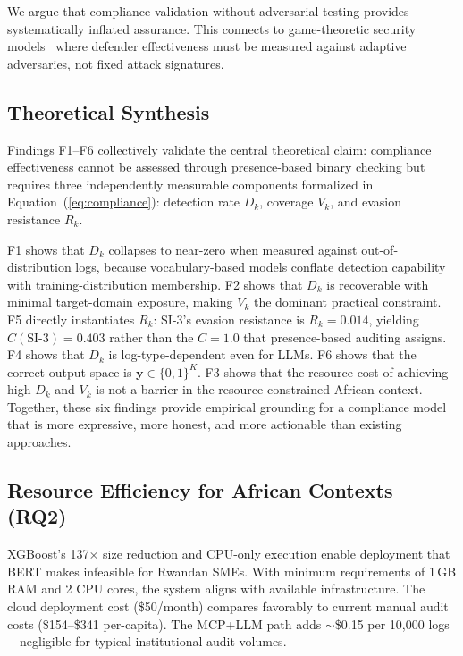 \documentclass[futureinternet,article,submit,pdftex,moreauthors]{Definitions/mdpi}
\begin{document}
We argue that compliance validation without adversarial testing provides systematically
inflated assurance. This connects to game-theoretic security models~\cite{mitre_attack_applications}
where defender effectiveness must be measured against adaptive adversaries, not fixed attack
signatures.

\subsection{Theoretical Synthesis}

Findings F1--F6 collectively validate the central theoretical claim: compliance effectiveness
cannot be assessed through presence-based binary checking but requires three independently
measurable components formalized in Equation~(\ref{eq:compliance}): detection rate $D_k$,
coverage $V_k$, and evasion resistance $R_k$.

F1 shows that $D_k$ collapses to near-zero when measured against out-of-distribution logs,
because vocabulary-based models conflate detection capability with training-distribution
membership. F2 shows that $D_k$ is recoverable with minimal target-domain exposure, making
$V_k$ the dominant practical constraint. F5 directly instantiates $R_k$: SI-3's evasion
resistance is $R_k = 0.014$, yielding $C(\text{SI-3}) = 0.403$ rather than the $C = 1.0$
that presence-based auditing assigns. F4 shows that $D_k$ is log-type-dependent even for
LLMs. F6 shows that the correct output space is $\mathbf{y} \in \{0,1\}^K$. F3 shows that
the resource cost of achieving high $D_k$ and $V_k$ is not a barrier in the
resource-constrained African context. Together, these six findings provide empirical grounding
for a compliance model that is more expressive, more honest, and more actionable than existing
approaches.

\subsection{Resource Efficiency for African Contexts (RQ2)}

XGBoost's 137$\times$ size reduction and CPU-only execution enable deployment that BERT
makes infeasible for Rwandan SMEs. With minimum requirements of 1\,GB RAM and 2 CPU cores,
the system aligns with available infrastructure. The cloud deployment cost (\$50/month)
compares favorably to current manual audit costs (\$154--\$341 per-capita). The MCP+LLM
path adds $\sim$\$0.15 per 10{,}000 logs---negligible for typical institutional audit volumes.
\end{document}
